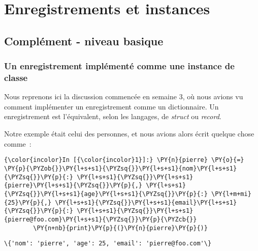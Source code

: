     
    
    
    

    

    \hypertarget{enregistrements-et-instances}{%
\section{Enregistrements et
instances}\label{enregistrements-et-instances}}

    \hypertarget{compluxe9ment---niveau-basique}{%
\subsection{Complément - niveau
basique}\label{compluxe9ment---niveau-basique}}

    \hypertarget{un-enregistrement-impluxe9mentuxe9-comme-une-instance-de-classe}{%
\subsubsection{Un enregistrement implémenté comme une instance de
classe}\label{un-enregistrement-impluxe9mentuxe9-comme-une-instance-de-classe}}

    Nous reprenons ici la discussion commencée en semaine 3, où nous avions
vu comment implémenter un enregistrement comme un dictionnaire. Un
enregistrement est l'équivalent, selon les langages, de \emph{struct} ou
\emph{record}.

    Notre exemple était celui des personnes, et nous avions alors écrit
quelque chose comme~:

    \begin{Verbatim}[commandchars=\\\{\}]
{\color{incolor}In [{\color{incolor}1}]:} \PY{n}{pierre} \PY{o}{=} \PY{p}{\PYZob{}}\PY{l+s+s1}{\PYZsq{}}\PY{l+s+s1}{nom}\PY{l+s+s1}{\PYZsq{}}\PY{p}{:} \PY{l+s+s1}{\PYZsq{}}\PY{l+s+s1}{pierre}\PY{l+s+s1}{\PYZsq{}}\PY{p}{,} \PY{l+s+s1}{\PYZsq{}}\PY{l+s+s1}{age}\PY{l+s+s1}{\PYZsq{}}\PY{p}{:} \PY{l+m+mi}{25}\PY{p}{,} \PY{l+s+s1}{\PYZsq{}}\PY{l+s+s1}{email}\PY{l+s+s1}{\PYZsq{}}\PY{p}{:} \PY{l+s+s1}{\PYZsq{}}\PY{l+s+s1}{pierre@foo.com}\PY{l+s+s1}{\PYZsq{}}\PY{p}{\PYZcb{}}
        \PY{n+nb}{print}\PY{p}{(}\PY{n}{pierre}\PY{p}{)}
\end{Verbatim}


    \begin{Verbatim}[commandchars=\\\{\}]
\{'nom': 'pierre', 'age': 25, 'email': 'pierre@foo.com'\}

    \end{Verbatim}

